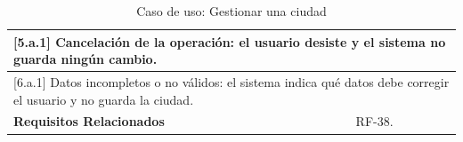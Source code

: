 \begin{table}[h!]
\begin{tabular}{|p{4cm}|p{11cm}|}
        \hline
        \multicolumn{2}{|p{15cm}|}{ [5.a.1] Cancelación de la operación: el usuario desiste y el sistema no guarda ningún cambio. } \\
        \hline
        \multicolumn{2}{|p{15cm}|}{ [6.a.1] Datos incompletos o no válidos: el sistema indica qué datos debe corregir el usuario y no guarda la ciudad. } \\
        \hline
        \textbf{Requisitos Relacionados} & RF-38. \\
        \hline
    \end{tabular}
    \caption{Caso de uso: Gestionar una ciudad}
\end{table}
